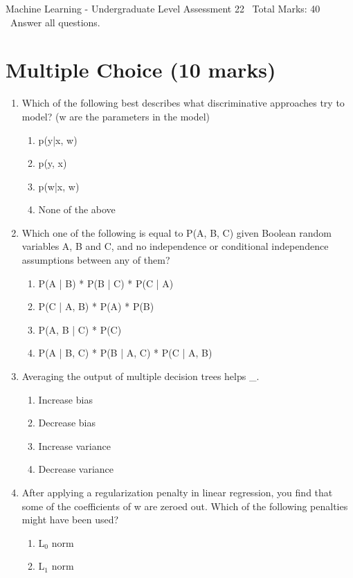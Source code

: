 \documentclass[12pt]{article}
\begin{document}
\begin{center}
Machine Learning - Undergraduate Level Assessment 22 \
Total Marks: 40 \
Answer all questions.
\end{center}

\section*{Multiple Choice (10 marks)}
\begin{enumerate}[label=\arabic*.]
\item Which of the following best describes what discriminative approaches try to model? (w are the parameters in the model)
\begin{enumerate}[label=(\alph*)]
    \item p(y|x, w)
    \item p(y, x)
    \item p(w|x, w)
    \item None of the above
\end{enumerate}
\item Which one of the following is equal to P(A, B, C) given Boolean random variables A, B and C, and no independence or conditional independence assumptions between any of them?
\begin{enumerate}[label=(\alph*)]
    \item P(A | B) * P(B | C) * P(C | A)
    \item P(C | A, B) * P(A) * P(B)
    \item P(A, B | C) * P(C)
    \item P(A | B, C) * P(B | A, C) * P(C | A, B)
\end{enumerate}
\item Averaging the output of multiple decision trees helps \_.
\begin{enumerate}[label=(\alph*)]
    \item Increase bias
    \item Decrease bias
    \item Increase variance
    \item Decrease variance
\end{enumerate}
\item After applying a regularization penalty in linear regression, you find that some of the coefficients of w are zeroed out. Which of the following penalties might have been used?
\begin{enumerate}[label=(\alph*)]
    \item L$_{0}$ norm
    \item L$_{1}$ norm

\end{enumerate}
\end{enumerate}
\end{document}

